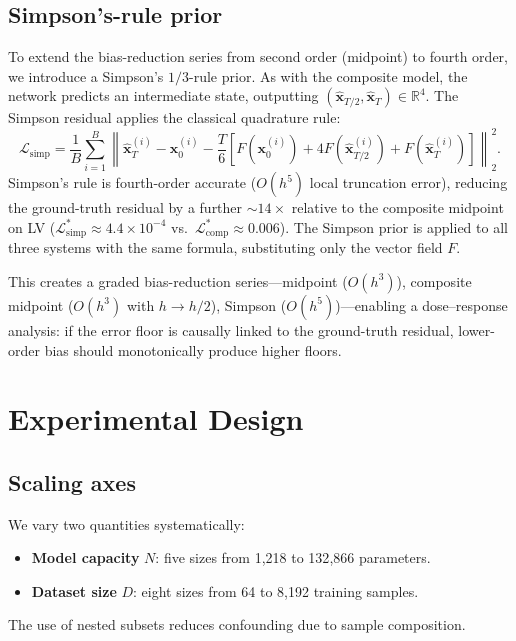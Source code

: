 \documentclass[11pt]{article}
\begin{document}
\subsection{Simpson's-rule prior}
\label{sec:simpson-prior}

To extend the bias-reduction series from second order (midpoint) to fourth order, we introduce a Simpson's $1/3$-rule prior.
As with the composite model, the network predicts an intermediate state, outputting $(\hat{\bm{x}}_{T/2}, \hat{\bm{x}}_T) \in \mathbb{R}^4$.
The Simpson residual applies the classical quadrature rule:
\[
\mathcal{L}_{\mathrm{simp}} = \frac{1}{B}\sum_{i=1}^{B} \left\|
\hat{\bm{x}}_T^{(i)} - \bm{x}_0^{(i)} - \frac{T}{6}\left[
F(\bm{x}_0^{(i)}) + 4F(\hat{\bm{x}}_{T/2}^{(i)}) + F(\hat{\bm{x}}_T^{(i)})
\right]
\right\|_2^2.
\]
Simpson's rule is fourth-order accurate ($O(h^5)$ local truncation error), reducing the ground-truth residual by a further $\sim\!14\times$ relative to the composite midpoint on LV ($\mathcal{L}_{\mathrm{simp}}^* \approx 4.4 \times 10^{-4}$ vs.\ $\mathcal{L}_{\mathrm{comp}}^* \approx 0.006$).
The Simpson prior is applied to all three systems with the same formula, substituting only the vector field $F$.

This creates a graded bias-reduction series---midpoint ($O(h^3)$), composite midpoint ($O(h^3)$ with $h \to h/2$), Simpson ($O(h^5)$)---enabling a dose--response analysis: if the error floor is causally linked to the ground-truth residual, lower-order bias should monotonically produce higher floors.

\section{Experimental Design}

\subsection{Scaling axes}

We vary two quantities systematically:
\begin{itemize}[leftmargin=*]
    \item \textbf{Model capacity} $N$: five sizes from 1{,}218 to 132{,}866 parameters.
    \item \textbf{Dataset size} $D$: eight sizes from 64 to 8{,}192 training samples.
\end{itemize}
The use of nested subsets reduces confounding due to sample composition.
\end{document}

